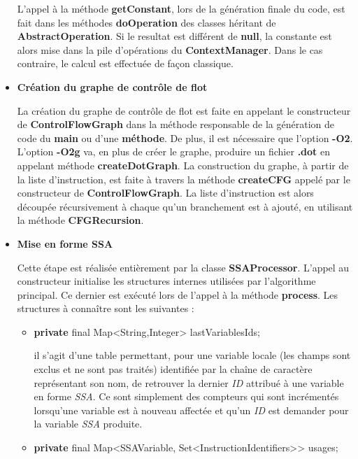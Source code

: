 \documentclass[
]{article}
\newenvironment{Shaded}{}{}
\newcommand{\BuiltInTok}[1]{#1}
\newcommand{\DataTypeTok}[1]{\textcolor[rgb]{0.56,0.13,0.00}{#1}}
\newcommand{\KeywordTok}[1]{\textcolor[rgb]{0.00,0.44,0.13}{\textbf{#1}}}
\newcommand{\NormalTok}[1]{#1}
\newcommand{\OperatorTok}[1]{\textcolor[rgb]{0.40,0.40,0.40}{#1}}
\begin{document}
\begin{itemize}
  L'appel à la méthode \textbf{getConstant}, lors de la génération
  finale du code, est fait dans les méthodes \textbf{doOperation} des
  classes héritant de \textbf{AbstractOperation}. Si le resultat est
  différent de \textbf{null}, la constante est alors mise dans la pile
  d'opérations du \textbf{ContextManager}. Dans le cas contraire, le
  calcul est effectuée de façon classique.
\item
  \textbf{Création du graphe de contrôle de flot}

  La création du graphe de contrôle de flot est faite en appelant le
  constructeur de \textbf{ControlFlowGraph} dans la méthode responsable
  de la génération de code du \textbf{main} ou d'une \textbf{méthode}.
  De plus, il est nécessaire que l'option \textbf{-O2}. L'option
  \textbf{-O2g} va, en plus de créer le graphe, produire un fichier
  \textbf{.dot} en appelant méthode \textbf{createDotGraph}. La
  construction du graphe, à partir de la liste d'instruction, est faite
  à travers la méthode \textbf{createCFG} appelé par le constructeur de
  \textbf{ControlFlowGraph}. La liste d'instruction est alors découpée
  récursivement à chaque qu'un branchement est à ajouté, en utilisant la
  méthode \textbf{CFGRecursion}.
\item
  \textbf{Mise en forme SSA}

  Cette étape est réalisée entièrement par la classe
  \textbf{SSAProcessor}. L'appel au constructeur initialise les
  structures internes utilisées par l'algorithme principal. Ce dernier
  est exécuté lors de l'appel à la méthode \textbf{process}. Les
  structures à connaître sont les suivantes :

  \begin{itemize}
  \item
\begin{Shaded}
\begin{Highlighting}[]
\KeywordTok{private} \DataTypeTok{final} \BuiltInTok{Map}\OperatorTok{\textless{}}\BuiltInTok{String}\OperatorTok{,}\BuiltInTok{Integer}\OperatorTok{\textgreater{}}\NormalTok{ lastVariablesIds}\OperatorTok{;}
\end{Highlighting}
\end{Shaded}

    il s'agit d'une table permettant, pour une variable locale (les
    champs sont exclus et ne sont pas traités) identifiée par la chaîne
    de caractère représentant son nom, de retrouver la dernier \emph{ID}
    attribué à une variable en forme \emph{SSA}. Ce sont simplement des
    compteurs qui sont incrémentés lorsqu'une variable est à nouveau
    affectée et qu'un \emph{ID} est demander pour la variable \emph{SSA}
    produite.
  \item
\begin{Shaded}
\begin{Highlighting}[]
\KeywordTok{private} \DataTypeTok{final} \BuiltInTok{Map}\OperatorTok{\textless{}}\NormalTok{SSAVariable}\OperatorTok{,} \BuiltInTok{Set}\OperatorTok{\textless{}}\NormalTok{InstructionIdentifiers}\OperatorTok{\textgreater{}\textgreater{}}\NormalTok{ usages}\OperatorTok{;}
\end{Highlighting}
\end{Shaded}


\end{itemize}
\end{itemize}
\end{document}
